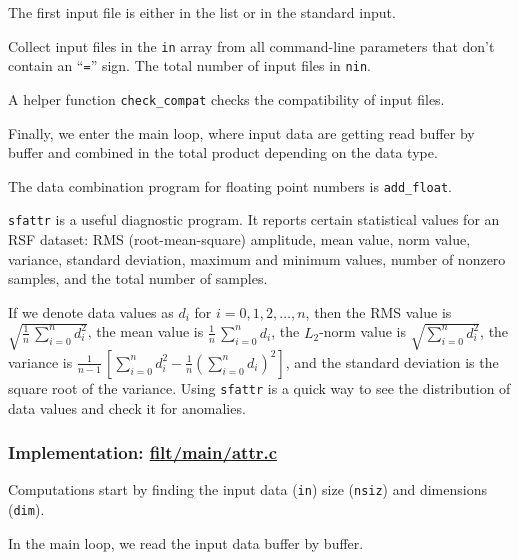 The first input file is either in the list or in the standard input.

Collect input files in the \texttt{in} array from all command-line
parameters that don't contain an ``\texttt{=}'' sign. The total number
of input files in \texttt{nin}.

A helper function \texttt{check\_compat} checks the compatibility of
input files.

Finally, we enter the main loop, where input data are getting read
buffer by buffer and combined in the total product depending on the
data type.

The data combination program for floating point numbers is
\texttt{add\_float}.  

\noindent\doublebox{\parbox{\textwidth}{

}}

\texttt{sfattr} is a useful diagnostic program. It reports certain
statistical values for an RSF dataset: RMS (root-mean-square)
amplitude, mean value, norm value, variance, standard deviation,
maximum and minimum values, number of nonzero samples, and the total
number of samples.

If we denote data values as $d_i$ for $i=0,1,2,\ldots,n$, then the RMS
value is $\sqrt{\frac{1}{n}\,\sum\limits_{i=0}^n d_i^2}$, the mean
value is $\frac{1}{n}\,\sum\limits_{i=0}^n d_i$, the $L_2$-norm value
is $\sqrt{\sum\limits_{i=0}^n d_i^2}$, the variance is
$\frac{1}{n-1}\,\left[\sum\limits_{i=0}^n d_i^2 - \frac{1}{n}\left(\sum\limits_{i=0}^n d_i\right)^2\right]$, and the standard
deviation is the square root of the variance. Using \texttt{sfattr}
is a quick way to see the distribution of data values and check it for
anomalies.

\subsubsection{Implementation: \href{http://svn.sourceforge.net/viewcvs.cgi/rsf/trunk/filt/main/attr.c?view=markup}{filt/main/attr.c}}

Computations start by finding the input data (\texttt{in}) size
(\texttt{nsiz}) and dimensions (\texttt{dim}).

In the main loop, we read the input data buffer by buffer.

